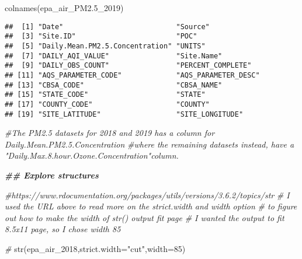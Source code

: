 \documentclass[
]{article}
\newenvironment{Shaded}{\begin{snugshade}}{\end{snugshade}}
\newcommand{\AttributeTok}[1]{\textcolor[rgb]{0.77,0.63,0.00}{#1}}
\newcommand{\CommentTok}[1]{\textcolor[rgb]{0.56,0.35,0.01}{\textit{#1}}}
\newcommand{\DecValTok}[1]{\textcolor[rgb]{0.00,0.00,0.81}{#1}}
\newcommand{\DocumentationTok}[1]{\textcolor[rgb]{0.56,0.35,0.01}{\textbf{\textit{#1}}}}
\newcommand{\FloatTok}[1]{\textcolor[rgb]{0.00,0.00,0.81}{#1}}
\newcommand{\FunctionTok}[1]{\textcolor[rgb]{0.00,0.00,0.00}{#1}}
\newcommand{\NormalTok}[1]{#1}
\newcommand{\StringTok}[1]{\textcolor[rgb]{0.31,0.60,0.02}{#1}}
\begin{document}
\begin{Shaded}
\begin{Highlighting}[]
\FunctionTok{colnames}\NormalTok{(epa\_air\_PM2}\FloatTok{.5}\NormalTok{\_2019)}
\end{Highlighting}
\end{Shaded}

\begin{verbatim}
##  [1] "Date"                           "Source"                        
##  [3] "Site.ID"                        "POC"                           
##  [5] "Daily.Mean.PM2.5.Concentration" "UNITS"                         
##  [7] "DAILY_AQI_VALUE"                "Site.Name"                     
##  [9] "DAILY_OBS_COUNT"                "PERCENT_COMPLETE"              
## [11] "AQS_PARAMETER_CODE"             "AQS_PARAMETER_DESC"            
## [13] "CBSA_CODE"                      "CBSA_NAME"                     
## [15] "STATE_CODE"                     "STATE"                         
## [17] "COUNTY_CODE"                    "COUNTY"                        
## [19] "SITE_LATITUDE"                  "SITE_LONGITUDE"
\end{verbatim}

\begin{Shaded}
\begin{Highlighting}[]
\CommentTok{\#The PM2.5 datasets for 2018 and 2019 has  a column for Daily.Mean.PM2.5.Concentration }
\CommentTok{\#where the remaining datasets instead, have a "Daily.Max.8.hour.Ozone.Concentration"column.}


\DocumentationTok{\#\# Explore structures }

\CommentTok{\#https://www.rdocumentation.org/packages/utils/versions/3.6.2/topics/str}
\CommentTok{\# I used the URL above to read more on the strict.width and width option }
\CommentTok{\# to figure out how to make the width of str() output fit page}
\CommentTok{\# I wanted the output to fit 8.5x11 page, so I chose width 85}

\CommentTok{\#}
\FunctionTok{str}\NormalTok{(epa\_air\_2018,}\AttributeTok{strict.width=}\StringTok{"cut"}\NormalTok{,}\AttributeTok{width=}\DecValTok{85}\NormalTok{)}
\end{Highlighting}
\end{Shaded}
\end{document}
